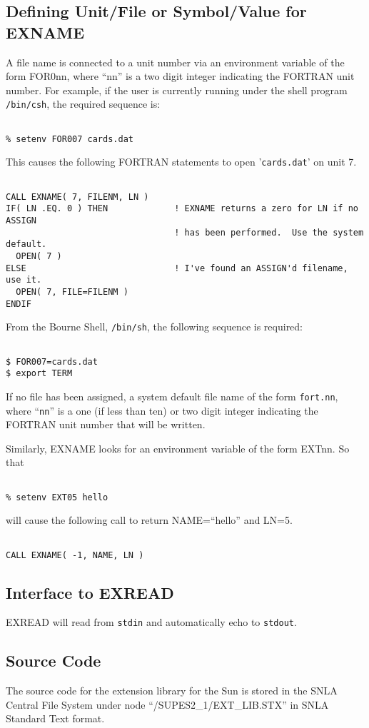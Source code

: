 \subsection{Defining Unit/File or Symbol/Value for EXNAME}
A file name is connected to a unit number via an environment
variable of the form FOR0nn,
where ``nn'' is a two digit integer indicating the FORTRAN unit number. For
example, if the user is currently running under the shell program
\verb+/bin/csh+, the required sequence is:
\begin{verbatim}

% setenv FOR007 cards.dat

\end{verbatim}
This causes the following FORTRAN statements to open '\verb+cards.dat+' on unit 7.
\begin{verbatim}

CALL EXNAME( 7, FILENM, LN )
IF( LN .EQ. 0 ) THEN             ! EXNAME returns a zero for LN if no ASSIGN
                                 ! has been performed.  Use the system default.
  OPEN( 7 )
ELSE                             ! I've found an ASSIGN'd filename, use it.
  OPEN( 7, FILE=FILENM )
ENDIF

\end{verbatim}

From the Bourne Shell,
\verb+/bin/sh+,
the following sequence is required:
\begin{verbatim}

$ FOR007=cards.dat
$ export TERM

\end{verbatim}
If no file has been assigned,
a system default file name of the form \verb+fort.nn+, where ``\verb+nn+''
is a one (if less than
ten) or two digit integer indicating the FORTRAN unit number that will be written.

Similarly,
EXNAME looks for an environment variable of the form
EXTnn.
So that
\begin{verbatim}

% setenv EXT05 hello

\end{verbatim}
will cause the following call to return NAME=``hello'' and LN=5.
\begin{verbatim}

CALL EXNAME( -1, NAME, LN )
\end{verbatim}

\subsection{Interface to EXREAD}
EXREAD will read from \verb+stdin+ and automatically echo to \verb+stdout+.

\subsection{Source Code}
The source code for the extension library for the Sun
is stored in the SNLA Central File System under node
``/SUPES2\_1/EXT\_LIB.STX''
in SNLA Standard Text format.

\cleardoublepage
